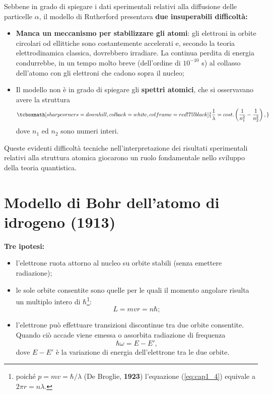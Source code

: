 Sebbene in grado di spiegare i dati sperimentali relativi alla diffusione delle particelle $\alpha$, il modello di Rutherford presentava \textbf{due insuperabili difficoltà:}
	\begin{itemize}
		\item \textbf{Manca un meccanismo per stabilizzare gli atomi}: gli elettroni in orbite circolari od ellittiche sono costantemente accelerati e, secondo la teoria elettrodinamica classica, dovrebbero irradiare. La continua perdita di energia condurrebbe, in un tempo molto breve (dell'ordine di $10^{-10}$ s) al collasso dell'atomo con gli elettroni che cadono sopra il nucleo;
		\item Il modello non è in grado di spiegare gli \textbf{spettri atomici}, che si osservavano avere la struttura
			\begin{equation}
				\tcboxmath[sharp corners=downhill ,colback=white,colframe=red!75!black]{
					\frac{1}{\lambda} = cost. \left( \frac{1}{n_1 ^2}-\frac{1}{n_2 ^2} \right),
					}
			\end{equation}
		dove $n_1$ ed $n_2$ sono numeri interi.\\
\end{itemize}

Queste evidenti difficoltà tecniche nell'interpretazione dei risultati sperimentali relativi alla struttura atomica giocarono un ruolo fondamentale nello sviluppo della teoria quantistica.
\section{Modello di Bohr dell'atomo di idrogeno (1913)}
\textbf{Tre ipotesi:}
	\begin{itemize}
	\item l'elettrone ruota attorno al nucleo su orbite stabili (senza emettere radiazione);
	\item le sole orbite consentite sono quelle per le quali il momento angolare risulta un multiplo intero di $\hbar$\footnote{poiché $p= mv =\hbar/\lambda$ (De Broglie, \textbf{1923}) l'equazione (\ref{eq:cap1_4}) equivale a $2\pi r=n\lambda$.}:
		\begin{equation}
			L= mvr =n\hbar ;
		\label{eq:cap1_4}
		\end{equation}
	\item l'elettrone può effettuare transizioni discontinue tra due orbite consentite. Quando ciò accade viene emessa o assorbita radiazione di frequenza
	\begin{equation}
			\hbar \omega = E-E' ,
		\label{eq:cap1_5}
		\end{equation}
dove $E-E'$ è la variazione di energia dell'elettrone tra le due orbite.\\
	\end{itemize}
	
